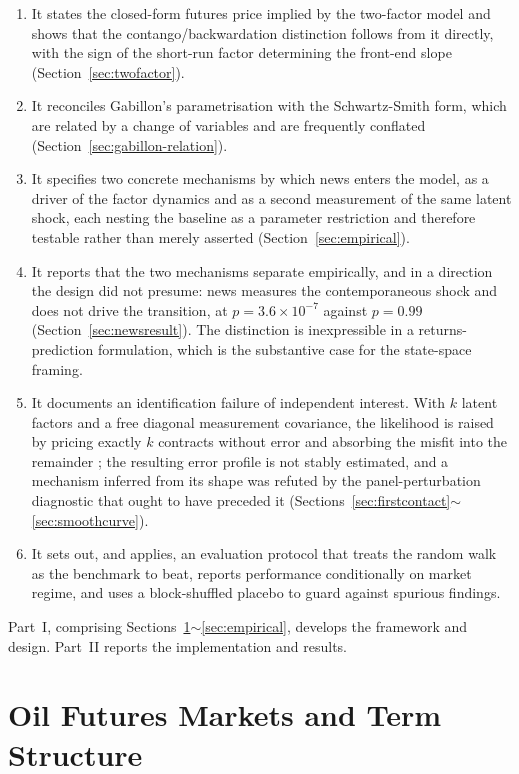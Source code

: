 \documentclass[journal]{IEEEtran}
\newcommand{\rng}{\ensuremath{\sim}}
\begin{document}
\begin{enumerate}
  \item It states the closed-form futures price implied by the two-factor model and shows that the contango/backwardation distinction follows from it directly, with the sign of the short-run factor determining the front-end slope (Section~\ref{sec:twofactor}).
  \item It reconciles Gabillon's parametrisation with the Schwartz-Smith form, which are related by a change of variables and are frequently conflated (Section~\ref{sec:gabillon-relation}).
  \item It specifies two concrete mechanisms by which news enters the model, as a driver of the factor dynamics and as a second measurement of the same latent shock, each nesting the baseline as a parameter restriction and therefore testable rather than merely asserted (Section~\ref{sec:empirical}).
  \item It reports that the two mechanisms separate empirically, and in a direction the design did not presume: news measures the contemporaneous shock and does not drive the transition, at $p = 3.6\times10^{-7}$ against $p = 0.99$ (Section~\ref{sec:newsresult}). The distinction is inexpressible in a returns-prediction formulation, which is the substantive case for the state-space framing.
  \item It documents an identification failure of independent interest. With $k$ latent factors and a free diagonal measurement covariance, the likelihood is raised by pricing exactly $k$ contracts without error and absorbing the misfit into the remainder \cite{ChenScott1993}; the resulting error profile is not stably estimated, and a mechanism inferred from its shape was refuted by the panel-perturbation diagnostic that ought to have preceded it (Sections~\ref{sec:firstcontact}\rng{}\ref{sec:smoothcurve}).
  \item It sets out, and applies, an evaluation protocol that treats the random walk as the benchmark to beat, reports performance conditionally on market regime, and uses a block-shuffled placebo to guard against spurious findings.
\end{enumerate}

Part~I, comprising Sections~\ref{sec:markets}\rng{}\ref{sec:empirical}, develops the framework and design. Part~II reports the implementation and results.

\section{Oil Futures Markets and Term Structure}
\label{sec:markets}
\end{document}
